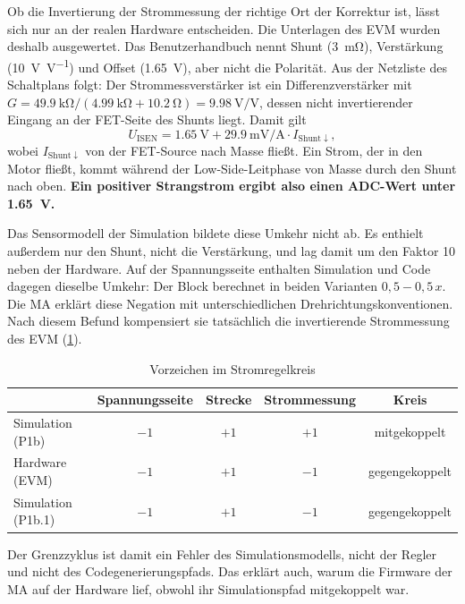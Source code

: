 Ob die Invertierung der Strommessung der richtige Ort der Korrektur ist, lässt sich nur
an der realen Hardware entscheiden. Die Unterlagen des \ac{EVM} wurden deshalb ausgewertet.
Das Benutzerhandbuch \cite{ti_slvubv6} nennt Shunt (\SI{3}{\milli\ohm}), Verstärkung
(\SI{10}{\volt\per\volt}) und Offset (\SI{1,65}{\volt}), aber nicht die Polarität. Aus der
Netzliste des Schaltplans \cite{ti_slvc817} folgt: Der Strommessverstärker ist ein
Differenzverstärker mit $G = \SI{49,9}{\kilo\ohm}/(\SI{4,99}{\kilo\ohm} + \SI{10,2}{\ohm})
= \SI{9,98}{\volt\per\volt}$, dessen nicht invertierender Eingang an der FET-Seite des Shunts
liegt. Damit gilt
\begin{equation}
  U_\mathrm{ISEN} = \SI{1,65}{\volt} + \SI{29,9}{\milli\volt\per\ampere} \cdot I_{\mathrm{Shunt}\downarrow},
\end{equation}
wobei $I_{\mathrm{Shunt}\downarrow}$ von der FET-Source nach Masse fließt. Ein Strom, der in
den Motor fließt, kommt während der Low-Side-Leitphase von Masse durch den Shunt nach oben.
\textbf{Ein positiver Strangstrom ergibt also einen \ac{ADC}-Wert unter \SI{1,65}{\volt}.}

Das Sensormodell der Simulation bildete diese Umkehr nicht ab. Es enthielt außerdem nur den
Shunt, nicht die Verstärkung, und lag damit um den Faktor 10 neben der Hardware. Auf der
Spannungsseite enthalten Simulation und Code dagegen dieselbe Umkehr: Der Block
 berechnet in beiden Varianten $0{,}5 - 0{,}5\,x$. Die \ac{MA}
erklärt diese Negation mit unterschiedlichen Drehrichtungskonventionen. Nach diesem Befund
kompensiert sie tatsächlich die invertierende Strommessung des \ac{EVM}
(\cref{tab:vorzeichen}).

\begin{table}[htbp]
  \centering
  \caption{Vorzeichen im Stromregelkreis}
  \label{tab:vorzeichen}
  \small
  \begin{tabular}{@{}lcccc@{}}
    \toprule
    & Spannungsseite & Strecke & Strommessung & Kreis \\
    \midrule
    Simulation (P1b) & $-1$ & $+1$ & $+1$ & mitgekoppelt \\
    Hardware (\ac{EVM}) & $-1$ & $+1$ & $-1$ & gegengekoppelt \\
    Simulation (P1b.1) & $-1$ & $+1$ & $-1$ & gegengekoppelt \\
    \bottomrule
  \end{tabular}
\end{table}

Der Grenzzyklus ist damit ein Fehler des Simulationsmodells, nicht der Regler und nicht des
Codegenerierungspfads. Das erklärt auch, warum die Firmware der \ac{MA} auf der Hardware lief,
obwohl ihr Simulationspfad mitgekoppelt war.

